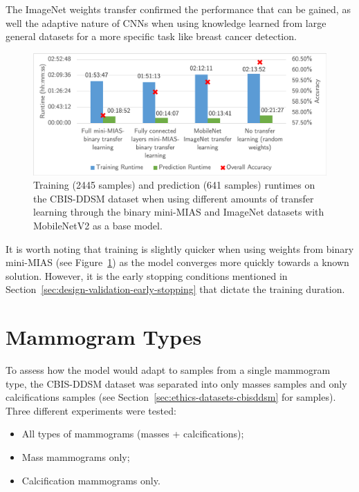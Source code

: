 The ImageNet weights transfer confirmed the performance that can be gained, as well the adaptive nature of CNNs when using knowledge learned from large general datasets for a more specific task like breast cancer detection.\\

\begin{figure}[h]
\centerline{\includegraphics[width=\textwidth]{figures/evaluation/transfer_learning_experiment/runtimes.png}}
\caption{\label{fig:evaluation-transfer_learning_experiment-runtimes}Training (2445 samples) and prediction (641 samples) runtimes on the CBIS-DDSM dataset when using different amounts of transfer learning through the binary mini-MIAS and ImageNet datasets with MobileNetV2 as a base model.}
\end{figure}

It is worth noting that training is slightly quicker when using weights from binary mini-MIAS (see Figure~\ref{fig:evaluation-transfer_learning_experiment-runtimes}) as the model converges more quickly towards a known solution. However, it is the early stopping conditions mentioned in Section~\ref{sec:design-validation-early-stopping} that dictate the training duration.


\section{Mammogram Types}

To assess how the model would adapt to samples from a single mammogram type, the CBIS-DDSM dataset was separated into only masses samples and only calcifications samples (see Section~\ref{sec:ethics-datasets-cbisddsm} for samples). Three different experiments were tested:
\begin{itemize}
    \item All types of mammograms (masses + calcifications);
    \item Mass mammograms only;
    \item Calcification mammograms only.
\end{itemize}

